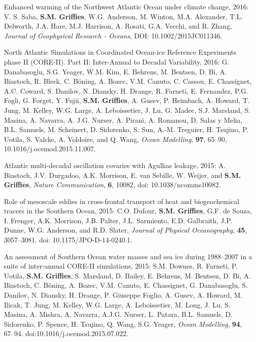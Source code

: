 \begin{etaremune}
\item Enhanced warming of the Northwest Atlantic Ocean under climate
  change, 2016: V. S. Saba, {\bf S.M. Grif\/f\/ies}, W.G. Anderson,
  M. Winton, M.A. Alexander, T.L. Delworth, J.A. Hare, M.J. Harrison,
  A. Rosati, G.A. Vecchi, and R. Zhang, {\it Journal of Geophysical
    Research - Oceans}, DOI: 10.1002/2015JC011346.

\item North Atlantic Simulations in Coordinated Ocean-ice Reference
  Experiments phase II (CORE-II). Part II: Inter-Annual to Decadal
  Variability, 2016: G. Danabasoglu, S.G. Yeager, W.M. Kim,
  E. Behrens, M. Bentsen, D. Bi, A. Biastoch, R. Bleck, C. B\"{o}ning,
  A. Bozec, V.M. Canuto, C. Cassou, E. Chassignet, A.C. Coward,
  S. Danilov, N. Diansky, H. Drange, R. Farneti, E. Fernandez,
  P.G. Fogli, G. Forget, Y. Fujii, {\bf S.M. Grif\/f\/ies}, A. Gusev,
  P. Heimbach, A. Howard, T. Jung, M. Kelley, W.G. Large,
  A. Leboissetier, J. Lu, G. Madec, S.J. Marsland, S. Masina,
  A. Navarra, A. J.G. Nurser, A. Pirani, A. Romanou, D. Salas y Melia,
  B.L. Samuels, M. Scheinert, D. Sidorenko, S. Sun, A.-M. Treguier,
  H. Tsujino, P. Uotila, S. Valcke, A. Voldoire, and Q. Wang, {\it
    Ocean Modelling}, {\bf 97}, 65--90, 10.1016/j.ocemod.2015.11.007.

\item Atlantic multi-decadal oscillation covaries with Agulhas
  leakage, 2015: A. Biastoch, J.V. Durgadoo, A.K. Morrison, E. van
  Sebille, W. Weijer, and {\bf S.M. Grif\/f\/ies}, {\it Nature
    Communication}, {\bf 6}, 10082, doi: 10.1038/ncomms10082.

\item Role of mesoscale eddies in cross-frontal transport of heat and
  biogeochemical tracers in the Southern Ocean, 2015: C.O. Dufour,
  {\bf S.M. Grif\/f\/ies}, G.F. de Souza, I. Frenger, A.K. Morrison,
  J.B. Palter, J.L. Sarmiento, E.D. Galbraith, J.P. Dunne,
  W.G. Anderson, and R.D. Slater, {\it Journal of Physical
    Oceanography}, {\bf 45}, 3057--3081. doi: 10.1175/JPO-D-14-0240.1.

\item An assessment of Southern Ocean water masses and sea ice during
  1988--2007 in a suite of inter-annual CORE-II simulations, 2015:
  S.M. Downes, R. Farneti, P. Uotila, {\bf S.M. Grif\/f\/ies},
  S. Marsland, D. Bailey, E. Behrens, M. Bentsen, D. Bi, A. Biastoch,
  C. B\"oning, A. Bozec, V.M. Canuto, E. Chassignet, G. Danabasoglu,
  S. Danilov, N. Diansky, H. Drange, P. Giuseppe Foglio, A. Gusev,
  A. Howard, M. Ilicak, T.  Jung, M. Kelley, W.G. Large,
  A. Leboissetier, M. Long, J. Lu, S. Masina, A. Mishra, A. Navarra,
  A.J.G. Nurser, L. Patara, B.L. Samuels, D. Sidorenko, P. Spence,
  H. Tsujino, Q. Wang, S.G. Yeager, {\it Ocean Modelling}, {\bf 94},
  67--94.  doi:10.1016/j.ocemod.2015.07.022.



\end{etaremune}
